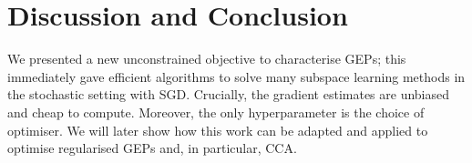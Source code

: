 \section{Discussion and Conclusion}

We presented a new unconstrained objective to characterise GEPs; this immediately gave efficient algorithms to solve many subspace learning methods in the stochastic setting with SGD.
Crucially, the gradient estimates are unbiased and cheap to compute.
Moreover, the only hyperparameter is the choice of optimiser.
We will later show how this work can be adapted and applied to optimise regularised GEPs and, in particular, CCA.